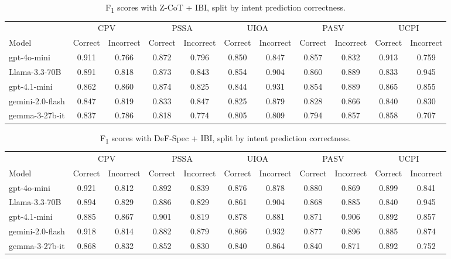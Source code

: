 \documentclass[11pt]{article}
\begin{document}
\begin{table}[!ht]
\scriptsize
\centering
\begin{tabular}{lcc|cc|cc|cc|cc}
\toprule
 & \multicolumn{2}{c}{CPV} & \multicolumn{2}{c}{PSSA} & \multicolumn{2}{c}{UIOA} & \multicolumn{2}{c}{PASV} & \multicolumn{2}{c}{UCPI} \\
\cmidrule(lr){2-3} \cmidrule(lr){4-5} \cmidrule(lr){6-7} \cmidrule(lr){8-9} \cmidrule(lr){10-11}
Model & Correct & Incorrect & Correct & Incorrect & Correct & Incorrect & Correct & Incorrect & Correct & Incorrect \\
\midrule
gpt-4o-mini & 0.911 & 0.766 & 0.872 & 0.796 & 0.850 & 0.847 & 0.857 & 0.832 & 0.913 & 0.759 \\
Llama-3.3-70B & 0.891 & 0.818 & 0.873 & 0.843 & 0.854 & 0.904 & 0.860 & 0.889 & 0.833 & 0.945 \\
gpt-4.1-mini & 0.862 & 0.860 & 0.874 & 0.825 & 0.844 & 0.931 & 0.854 & 0.889 & 0.865 & 0.855 \\
gemini-2.0-flash & 0.847 & 0.819 & 0.833 & 0.847 & 0.825 & 0.879 & 0.828 & 0.866 & 0.840 & 0.830 \\
gemma-3-27b-it & 0.837 & 0.786 & 0.818 & 0.774 & 0.805 & 0.809 & 0.794 & 0.857 & 0.858 & 0.707 \\
\bottomrule
\end{tabular}
\caption{F\textsubscript{1} scores with Z-CoT + IBI, split by intent prediction correctness.}
\label{tab:zcot_intent_influence}
\end{table}



\begin{table}[!ht]
\scriptsize
\centering
\begin{tabular}{lcc|cc|cc|cc|cc}
\toprule
 & \multicolumn{2}{c}{CPV} & \multicolumn{2}{c}{PSSA} & \multicolumn{2}{c}{UIOA} & \multicolumn{2}{c}{PASV} & \multicolumn{2}{c}{UCPI} \\
\cmidrule(lr){2-3} \cmidrule(lr){4-5} \cmidrule(lr){6-7} \cmidrule(lr){8-9} \cmidrule(lr){10-11}
Model & Correct & Incorrect & Correct & Incorrect & Correct & Incorrect & Correct & Incorrect & Correct & Incorrect \\
\midrule
gpt-4o-mini & 0.921 & 0.812 & 0.892 & 0.839 & 0.876 & 0.878 & 0.880 & 0.869 & 0.899 & 0.841 \\
Llama-3.3-70B & 0.894 & 0.829 & 0.886 & 0.829 & 0.861 & 0.904 & 0.868 & 0.885 & 0.840 & 0.945 \\
gpt-4.1-mini & 0.885 & 0.867 & 0.901 & 0.819 & 0.878 & 0.881 & 0.871 & 0.906 & 0.892 & 0.857 \\
gemini-2.0-flash & 0.918 & 0.814 & 0.882 & 0.879 & 0.866 & 0.932 & 0.877 & 0.896 & 0.885 & 0.874 \\
gemma-3-27b-it & 0.868 & 0.832 & 0.852 & 0.830 & 0.840 & 0.864 & 0.840 & 0.871 & 0.892 & 0.752 \\
\bottomrule
\end{tabular}
\caption{F\textsubscript{1} scores with DeF-Spec + IBI, split by intent prediction correctness.}
\label{tab:defspec_intent_influence}
\end{table}
\end{document}
